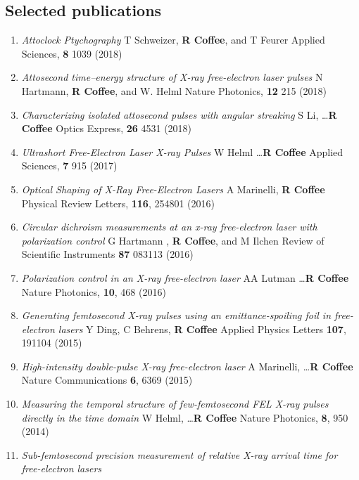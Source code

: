 
\subsection*{Selected publications}
\begin{enumerate}
\item \textit{Attoclock Ptychography}
T Schweizer, \etal \textbf{R Coffee}, and T Feurer 
Applied Sciences, \textbf{8} 1039 (2018)
\item \textit{Attosecond time–energy structure of X-ray free-electron laser pulses}
N Hartmann, \etal \textbf{R Coffee}, and W. Helml
Nature Photonics, \textbf{12} 215 (2018)
\item \textit{Characterizing isolated attosecond pulses with
angular streaking}
S Li, \ldots \textbf{R Coffee}\etal 
Optics Express, \textbf{26} 4531 (2018)
\item \textit{Ultrashort Free-Electron Laser X-ray Pulses}
W Helml \ldots \textbf{R Coffee} \etal
Applied Sciences, \textbf{7} 915 (2017)
\item \textit{Optical Shaping of X-Ray Free-Electron Lasers}
A Marinelli, \textbf{R Coffee}\etal
Physical Review Letters, \textbf{116}, 254801 (2016)
\item \textit{Circular dichroism measurements at an x-ray free-electron laser with polarization control}
G Hartmann \etal, \textbf{R Coffee}, and M Ilchen 
Review of Scientific Instruments \textbf{87} 083113 (2016)
\item \textit{Polarization control in an X-ray free-electron laser}
AA Lutman \ldots \textbf{R Coffee}\etal 
Nature Photonics, \textbf{10}, 468 (2016)
\item \textit{Generating femtosecond X-ray pulses using an emittance-spoiling foil in free-electron lasers}
Y Ding, C Behrens, \textbf{R Coffee}\etal
Applied Physics Letters \textbf{107}, 191104 (2015)
\item \textit{High-intensity double-pulse X-ray free-electron laser}
A Marinelli, \ldots \textbf{R Coffee}\etal
Nature Communications \textbf{6}, 6369 (2015)
\item \textit{Measuring the temporal structure of few-femtosecond FEL X-ray pulses directly in the time domain}
W Helml, \ldots \textbf{R Coffee}\etal
Nature Photonics, \textbf{8}, 950 (2014)
\item \textit{Sub-femtosecond precision measurement of relative X-ray arrival time for free-electron lasers}

\end{enumerate}
